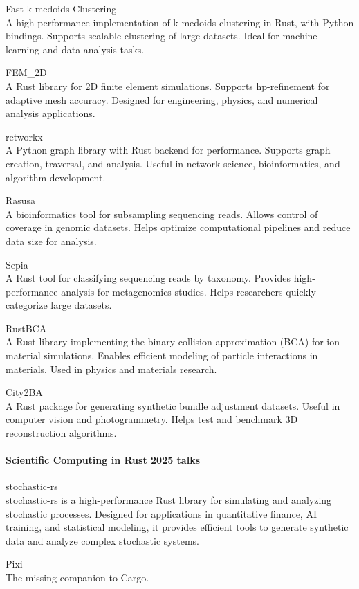 \documentclass{article}
\begin{document}
Fast k-medoids Clustering\\
A high-performance implementation of k-medoids clustering in Rust, with
Python bindings. Supports scalable clustering of large datasets. Ideal for machine learning and
data analysis tasks.

FEM\_2D\\
A Rust library for 2D finite element simulations. Supports hp-refinement for adaptive
mesh accuracy. Designed for engineering, physics, and numerical analysis applications.

retworkx\\
A Python graph library with Rust backend for performance. Supports graph creation,
traversal, and analysis. Useful in network science, bioinformatics, and algorithm development.

Rasusa\\
A bioinformatics tool for subsampling sequencing reads. Allows control of coverage in
genomic datasets. Helps optimize computational pipelines and reduce data size for analysis.

Sepia\\
A Rust tool for classifying sequencing reads by taxonomy. Provides high-performance
analysis for metagenomics studies. Helps researchers quickly categorize large datasets.

RustBCA\\
A Rust library implementing the binary collision approximation (BCA) for ion-material
simulations. Enables efficient modeling of particle interactions in materials. Used in physics and
materials research.

City2BA\\
A Rust package for generating synthetic bundle adjustment datasets. Useful in computer
vision and photogrammetry. Helps test and benchmark 3D reconstruction algorithms.

\paragraph{Scientific Computing in Rust 2025 talks}

stochastic-rs\\
stochastic-rs is a high-performance Rust library for simulating and analyzing
stochastic processes. Designed for applications in quantitative finance, AI training, and
statistical modeling, it provides efficient tools to generate synthetic data and analyze complex
stochastic systems.

Pixi\\
The missing companion to Cargo.
\end{document}
